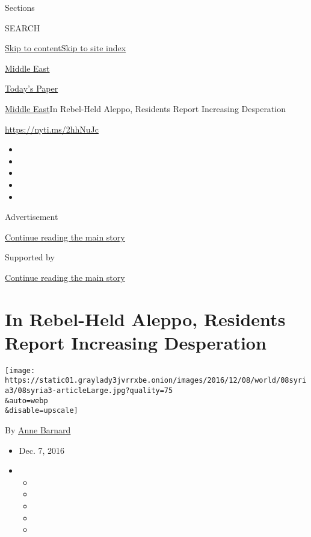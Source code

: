Sections

SEARCH

\protect\hyperlink{site-content}{Skip to
content}\protect\hyperlink{site-index}{Skip to site index}

\href{https://www.nytimes3xbfgragh.onion/section/world/middleeast}{Middle
East}

\href{https://myaccount.nytimes3xbfgragh.onion/auth/login?response_type=cookie\&client_id=vi}{}

\href{https://www.nytimes3xbfgragh.onion/section/todayspaper}{Today's
Paper}

\href{/section/world/middleeast}{Middle East}\textbar{}In Rebel-Held
Aleppo, Residents Report Increasing Desperation

\url{https://nyti.ms/2hhNuJc}

\begin{itemize}
\item
\item
\item
\item
\item
\end{itemize}

Advertisement

\protect\hyperlink{after-top}{Continue reading the main story}

Supported by

\protect\hyperlink{after-sponsor}{Continue reading the main story}

\hypertarget{in-rebel-held-aleppo-residents-report-increasing-desperation}{%
\section{In Rebel-Held Aleppo, Residents Report Increasing
Desperation}\label{in-rebel-held-aleppo-residents-report-increasing-desperation}}

\texttt{[image: https://static01.graylady3jvrrxbe.onion/images/2016/12/08/world/08syria3/08syria3-articleLarge.jpg?quality=75\\\&auto=webp\\\&disable=upscale]}

By \href{http://www.nytimes3xbfgragh.onion/by/anne-barnard}{Anne
Barnard}

\begin{itemize}
\item
  Dec. 7, 2016
\item
  \begin{itemize}
  \item
  \item
  \item
  \item
  \item
  \end{itemize}
\end{itemize}


